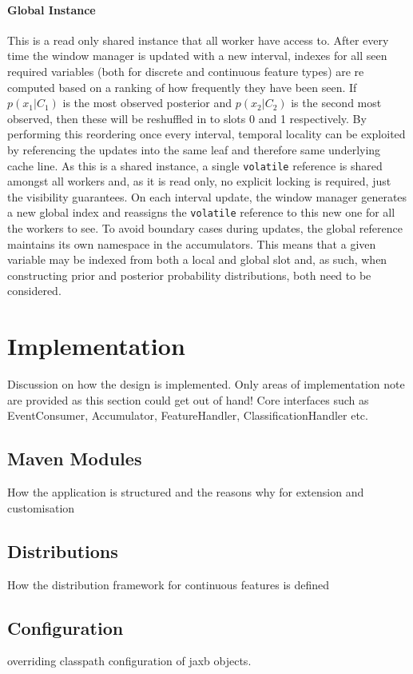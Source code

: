 \documentclass[a4paper,11pt]{scrreprt}
\begin{document}
\subsubsection{Global Instance}
This is a read only shared instance that all worker have access to. After every time the window manager is updated with a new interval, indexes for all seen required variables (both for discrete and continuous feature types) are re computed based on a ranking of how frequently they have been seen. If \(p(x_1 | C_1)\) is the most observed posterior and \(p(x_2 | C_2)\) is the second most observed, then these will be reshuffled in to slots 0 and 1 respectively. By performing this reordering once every interval, temporal locality can be exploited by referencing the updates into the same leaf and therefore same underlying cache line. As this is a shared instance, a single \texttt{volatile} reference is shared amongst all workers and, as it is read only, no explicit locking is required, just the visibility guarantees. On each interval update, the window manager generates a new global index and reassigns the \texttt{volatile} reference to this new one for all the workers to see. To avoid boundary cases during updates, the global reference maintains its own namespace in the accumulators. This means that a given variable may be indexed from both a local and global slot and, as such, when constructing prior and posterior probability distributions, both need to be considered.
\chapter{Implementation}
Discussion on how the design is implemented. Only areas of implementation note are provided as this section could get out of hand! Core interfaces such as EventConsumer, Accumulator, FeatureHandler, ClassificationHandler etc.
\section{Maven Modules}
How the application is structured and the reasons why for extension and customisation
\section{Distributions}
How the distribution framework for continuous features is defined 
\section{Configuration}
overriding classpath configuration of jaxb objects.
\end{document}
